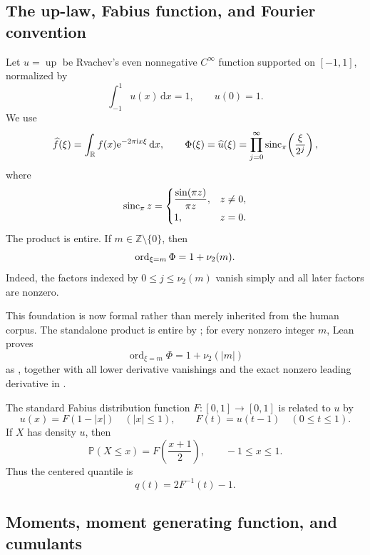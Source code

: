 \documentclass[11pt,oneside]{article}
\numberwithin{equation}{section}
\theoremstyle{definition}
\theoremstyle{remark}
\newcommand{\R}{\mathbb R}
\newcommand{\Z}{\mathbb Z}
\newcommand{\Up}{\operatorname{up}}
\newcommand{\e}{\mathrm e}
\newcommand{\dd}{\,\mathrm d}
\newcommand{\abs}[1]{\left|#1\right|}
\begin{document}
\subsection{The up-law, Fabius function, and Fourier convention}

Let $u=\Up$ be Rvachev's even nonnegative $C^\infty$ function supported on $[-1,1]$, normalized by
\[
 \int_{-1}^{1}u(x)\dd x=1,
 \qquad u(0)=1.
\]
We use
\begin{equation}
 \widehat f(\xi)=\int_{\R}f(x)\e^{-2\pi\iu x\xi}\dd x,
 \qquad
 \Phi(\xi)=\widehat u(\xi)
 =\prod_{j=0}^{\infty}\sincpi\!\left(\frac{\xi}{2^j}\right),
 \label{p3:eq:Phi-product}
\end{equation}
where
\[
 \operatorname{sinc}_{\pi} z=\begin{cases}\dfrac{\sin(\pi z)}{\pi z},&z\ne0,\\[0.4em]1,&z=0.\end{cases}
\]
The product is entire.  If $m\in\Z\setminus\{0\}$, then
\begin{equation}
 \operatorname{ord}_{\xi=m}\Phi=1+\nu_2(m).
 \label{p3:eq:integer-multiplicity}
\end{equation}
Indeed, the factors indexed by $0\le j\le\nu_2(m)$ vanish simply and all later factors are nonzero.

This foundation is now formal rather than merely inherited from the human
corpus.  The standalone product is entire by
; for every nonzero
integer \(m\), Lean proves
\[
 \operatorname{ord}_{\xi=m}\Phi=1+\nu_2(|m|)
\]
as , together with
all lower derivative vanishings and the exact nonzero leading derivative
in .

The standard Fabius distribution function $F:[0,1]\to[0,1]$ is related to $u$ by
\begin{equation}
 u(x)=F(1-\abs{x})\quad (\abs{x}\le1),
 \qquad
 F(t)=u(t-1)\quad(0\le t\le1).
 \label{p3:eq:F-up-relation}
\end{equation}
If $X$ has density $u$, then
\begin{equation}
 \mathbb P(X\le x)=F\!\left(\frac{x+1}{2}\right),
 \qquad -1\le x\le1.
 \label{p3:eq:centered-CDF}
\end{equation}
Thus the centered quantile is
\begin{equation}
 q(t)=2F^{-1}(t)-1.
 \label{p3:eq:centered-quantile}
\end{equation}

\subsection{Moments, moment generating function, and cumulants}
\end{document}
